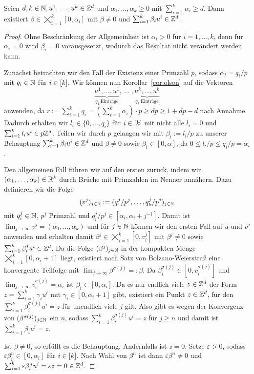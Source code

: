 \begin{lemma}
	Seien $d,k\in\mathbb{N}, u^1,\dots, u^k\in\mathbb{Z}^d$ und $\alpha_1,\dots,\alpha_k\geq0$ mit $\sum_{i=1}^k \alpha_i\geq d$.
	Dann existiert $\beta\in\bigtimes_{i=1}^k[0,\alpha_i]$ mit $\beta\neq0$ und $\sum_{i=1}^k\beta_i u^i \in\mathbb{Z}^d$.
\end{lemma}
\begin{proof}
	\newcommand{\bbeta}{\tilde{\beta}}
	Ohne Beschränkung der Allgemeinheit ist $\alpha_i>0$ für $i=1,\dots,k$, denn für $\alpha_i=0$ wird $\beta_i=0$ vorausgesetzt, wodurch das Resultat nicht verändert werden kann.
	
	Zunächst betrachten wir den Fall der Existenz einer Primzahl $p$, sodass   $\alpha_i=q_i / p$ mit $q_i\in\mathbb{N}$ für $i\in[k]$.
	Wir können nun Korollar~\ref{cor:olson} auf die Vektoren
	$$\underbrace{u^1,\dots,u^1}_{q_1~\text{Einträge}},~\dots~,\underbrace{u^k,\dots,u^k}_{q_k~\text{Einträge}}$$
	anwenden, da $r:=\sum_{i=1}^k q_i=(\sum_{i=1}^k \alpha_i)\cdot p\geq dp \geq 1+dp-d$ nach Annahme.
	Dadurch erhalten wir $l_i\in\{0,\dots,q_i\}$ für $i\in[k]$ mit nicht alle $l_i=0$ und $\sum_{i=1}^k l_i u^i\in p\mathbb{Z}^d$.
	Teilen wir durch $p$ gelangen wir mit $\beta_i := l_i/p$ zu unserer Behauptung $\sum_{i=1}^k \beta_i u^i\in\mathbb{Z}^d$ und $\beta\neq0$ sowie $\beta_i\in[0,\alpha]$, da $0\leq l_i/p\leq q_i/p=\alpha_i$.
	
	Den allgemeinen Fall führen wir auf den ersten zurück, indem wir $(\alpha_1,\dots,\alpha_k)\in\mathbb{R}^k$ durch Brüche mit Primzahlen im Nenner annähern.
	Dazu definieren wir die Folge 
	$$
	(v^j)_{j\in\mathbb{N}}:=(q^j_1/p^j,\dots,q^j_k/p^j)_{j\in\mathbb{N}}$$
	mit $q^j_i\in\mathbb{N}$, $p^j$ Primzahl und $q^j_i/p^j\in[\alpha_i, \alpha_i+j^{-1}]$.
	Damit ist $\lim_{j\rightarrow\infty}v^j=(\alpha_1,\dots,\alpha_k)$ und für $j\in\mathbb{N}$ können wir den ersten Fall auf $u$ und $v^j$ anwenden und erhalten damit $\beta^j\in\bigtimes_{i=1}^k[0,v^j_i]$ mit $\beta^j\neq0$ sowie $\sum_{i=1}^k\beta^j_i u^i \in\mathbb{Z}^d$.
	Da die Folge $(\beta^j)_{j\in\mathbb{N}}$ in der kompakten Menge $\bigtimes_{i=1}^k[0,\alpha_i+1]$ liegt, existiert nach Satz von Bolzano-Weierstraß eine konvergente Teilfolge mit $\lim_{j\to\infty} \beta^{\sigma(j)}=:\beta$.
	Da $\beta^{\sigma(j)}_i\in[0,v^{\sigma(j)}_i]$ und $\lim_{j\to\infty}v^{\sigma(j)}_i=\alpha_i$ ist $\beta_i\in[0,\alpha_i]$.
	Da es nur endlich viele $z\in\mathbb{Z}^d$ der Form $z=\sum_{i=1}^k\gamma_i u^i$ mit $\gamma_i\in[0,\alpha_i+1]$ gibt, existiert ein Punkt $z\in\mathbb{Z}^d$, für den $\sum_{i=1}^k \beta^{\sigma(j)}_i u^i=z$ für unendlich viele $j$ gilt.
	Also gibt es wegen der Konvergenz von $(\beta^{\sigma(j)})_{j\in\mathbb{N}}$ ein $n$, sodass $\sum_{i=1}^k\beta^{\sigma(j)}_i u^i=z$ für $j\geq n$ und damit ist $\sum_{i=1}^k\beta_i u^i=z$.
	
	Ist $\beta\neq0$, so erfüllt es die Behauptung.
	Andernfalls ist $z=0$.
	Setze $\varepsilon>0$, sodass $\varepsilon\beta^n_i\in[0,\alpha_i]$ für $i\in[k]$.
	Nach Wahl von $\beta^n$ ist dann $\varepsilon\beta^n\neq0$ und $\sum_{i=1}^k\varepsilon\beta^n_iu^i=\varepsilon z=0\in\mathbb{Z}^d$.
\end{proof}


